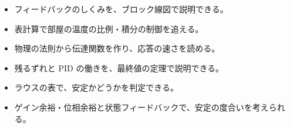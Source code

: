 \makeatletter
\newcommand\rxesum[2]{\node[draw=bkInk, line width=0.8pt, circle, minimum size=5mm, inner sep=0pt, fill=white] (#1) at #2 {};}
\newcommand\rxeblk[3]{\node[bk node, minimum height=9mm, font=\sffamily\footnotesize] (#1) at #2 {#3};}
\makeatother


\begin{goal}
\begin{itemize}[label={\color{bkTheme}●}, leftmargin=1.6\zw, itemsep=0pt, topsep=1pt]
\item {}\enspace フィードバックのしくみを、ブロック線図で説明できる。
\item {}\enspace 表計算で部屋の温度の比例・積分の制御を追える。
\item {}\enspace 物理の法則から伝達関数を作り、応答の速さを読める。
\item {}\enspace 残るずれと PID の働きを、最終値の定理で説明できる。
\item {}\enspace ラウスの表で、安定かどうかを判定できる。
\item {}\enspace ゲイン余裕・位相余裕と状態フィードバックで、安定の度合いを考えられる。
\end{itemize}
\end{goal}

